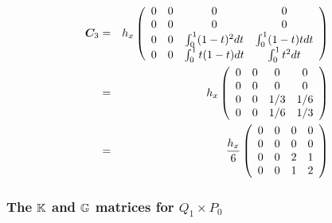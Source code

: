 \begin{eqnarray}
{\bm C}_3 
&=&
h_x
\left(
\begin{array}{cccc}
0 & 0 & 0 & 0 \\
0 & 0 & 0 & 0 \\ 
0 & 0 & \int_{0}^1 (1-t)^2 dt & \int_{0}^1 (1-t)t  dt \\
0 & 0 & \int_{0}^1 t(1-t) dt & \int_{0}^1 t^2 dt 
\end{array}
\right) \nonumber\\
&=& 
h_x
\left(
\begin{array}{cccc}
0 & 0 & 0 & 0 \\ 
0 & 0 & 0 & 0  \\
0 & 0 & 1/3 & 1/6 \\
0 & 0 & 1/6 & 1/3 
\end{array}
\right) \nonumber\\
&=& 
\frac{h_x}{6}
\left(
\begin{array}{cccc}
0 & 0 & 0 & 0 \\ 
0 & 0 & 0 & 0  \\
0 & 0 & 2 & 1 \\
0 & 0 & 1 & 2 
\end{array}
\right) 
\end{eqnarray}



\subsubsection{The ${\mathbb{K}}$ and ${\mathbb{G}}$ matrices for $Q_1 \times P_0$}

